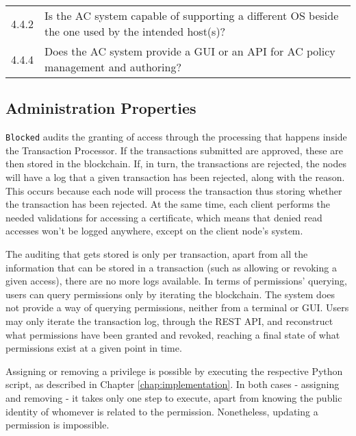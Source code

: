 {\begin{table}[htb]
\begin{tabular}{l|l}
		\hline \rowcolor{lightgray} \multicolumn{2}{l}{Support Properties}                                                                         \\ \hline
		4.4.2              & \llap{\textbullet} Is the AC system capable of supporting a different OS beside the one used by the intended host(s)? \\ \hline
		4.4.4              & \llap{\textbullet} Does the AC system provide a GUI or an API for AC policy management and authoring?                 \\
		\hline
	\end{tabular}
\end{table}
}

\subsection{Administration Properties}

\texttt{Blocked} audits the granting of access through the processing that happens inside the Transaction Processor. If the transactions submitted are approved, these are then stored in the blockchain. If, in turn, the transactions are rejected, the nodes will have a log that a given transaction has been rejected, along with the reason. This occurs because each node will process the transaction thus storing whether the transaction has been rejected. At the same time, each client performs the needed validations for accessing a certificate, which means that denied read accesses won't be logged anywhere, except on the client node's system.

The auditing that gets stored is only per transaction, apart from all the information that can be stored in a transaction (such as allowing or revoking a given access), there are no more logs available.  In terms of permissions' querying, users can query permissions only by iterating the blockchain. The system does not provide a way of querying permissions, neither from a terminal or GUI. Users may only iterate the transaction log, through the REST API, and reconstruct what permissions have been granted and revoked, reaching a final state of what permissions exist at a given point in time.

Assigning or removing a privilege is possible by executing the respective Python script, as described in Chapter \ref{chap:implementation}. In both cases - assigning and removing - it takes only one step to execute, apart from knowing the public identity of whomever is related to the permission. Nonetheless, updating a permission is impossible.


